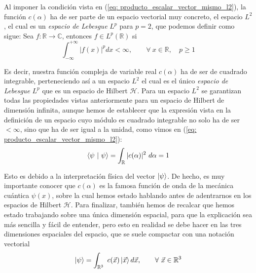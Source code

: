 \documentclass{article}
\numberwithin{equation}{section} %
\begin{document}
    \vspace{5mm}

    Al imponer la condición vista en (\ref{eq: producto_escalar_vector_mismo_l2}), la función \( c(\alpha) \) ha de ser parte de un espacio vectorial muy concreto, el espacio \( L^{2} \), el cual es un \textit{espacio de Lebesgue} \( L^{p} \) para \( p = 2 \), que podemos definir como sigue: Sea \( f: \mathbb{R} \rightarrow \mathbb{C} \), entonces \( f \in L^{p} (\mathbb{R}) \) si
    \begin{equation}
        \int_{-\infty}^{+\infty} | f (x) | ^ {p} d x < \infty, \qquad \forall \ x \in \mathbb{R}, \quad p \geq 1
    \end{equation}

    \vspace{2.5mm}

    Es decir, nuestra función compleja de variable real \( c(\alpha) \) ha de ser de cuadrado integrable, perteneciendo así a un espacio \( L^{2} \) el cual es el único \textit{espacio de Lebesgue} \( L^{p} \) que es un espacio de Hilbert \( \mathcal{H} \). Para un espacio \( L^{2} \) se garantizan todas las propiedades vistas anteriormente para un espacio de Hilbert de dimensión infinita, aunque hemos de establecer que la expresión vista en la definición de un espacio cuyo módulo es cuadrado integrable no solo ha de ser \( < \infty \), sino que ha de ser igual a la unidad, como vimos en (\ref{eq: producto_escalar_vector_mismo_l2}):
    \begin{equation*}
        \braket{\psi \ | \ \psi} =  \int_{\mathbb{R}} | c (\alpha) | ^ {2} \ d \alpha = 1
    \end{equation*}

    \vspace{2.5mm}

    Esto es debido a la interpretación física del vector \( \ket{\psi} \). De hecho, es muy importante conocer que \( c(\alpha) \) es la famosa función de onda de la mecánica cuántica \( \psi(x) \), sobre la cual hemos estado hablando antes de adentrarnos en los espacios de Hilbert \( \mathcal{H} \). Para finalizar, también hemos de recalcar que hemos estado trabajando sobre una única dimensión espacial, para que la explicación sea más sencilla y fácil de entender, pero esto en realidad se debe hacer en las tres dimensiones espaciales del espacio, que se suele compactar con una notación vectorial
    \begin{equation*}
        \ket{\psi} = \int_{\mathbb{R}^{3}} \ c(\vec{x}) \ket{\vec{x}} d \vec{x}, \qquad \forall \ \vec{x} \in \mathbb{R}^{3}
    \end{equation*}
\end{document}
